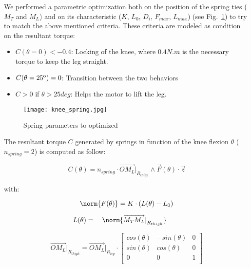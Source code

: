 We performed a parametric optimization both on the position of the spring ties ($M_T$ and $M_L$) and on its characteristic ($K$, $L_0$, $D_i$, $F_{max}$, $L_{max}$) (see Fig.~\ref{fig:knee_conception}) to try to match the above mentioned criteria. These criteria are modeled as condition on the resultant torque:

\begin{itemize}
    \item $C(\theta=0) < -0.4$: Locking of the knee, where $0.4 N.m$ is the necessary torque to keep the leg straight.
    \item $C(\theta=25 \textsuperscript{o} ) = 0$: Transition between the two behaviors
    \item $C > 0$ if $\theta > 25 deg$: Helps the motor to lift the leg.
\end{itemize}

\begin{figure}[thpb]
    \centering
    \texttt{[image: knee\_spring.jpg]}
    \caption{Spring parameters to optimized}
    \label{fig:knee_conception}
\end{figure}


The resultant torque $C$ generated by springs in function of the knee flexion $\theta$  ($n_{spring} = 2$) is computed as follow:

\begin{equation}
    C(\theta) = n_{spring} \cdot \overrightarrow{OM_L}{\rvert}_{R_{thigh}} \wedge \overrightarrow{F}(\theta) \cdot \overrightarrow{z}
\end{equation}

with:

\begin{equation}
    \norm{ F(\theta)} = K \cdot \left ( L(\theta) - L_0\right )
\end{equation}

\begin{equation}
    L(\theta) = \quad \norm{ \overrightarrow{M_T M_L}{\rvert}_{R_{thigh}}}\qquad
\end{equation}

\begin{equation}
    \overrightarrow{OM_L}{\rvert}_{R_{thigh}}  = \overrightarrow{OM_L}{\rvert}_{R_{leg}}  \cdot
    \begin{bmatrix}
        cos(\theta) & -sin(\theta) & 0 \\
        sin(\theta) & cos(\theta) & 0 \\
        0 & 0 & 1\\
    \end{bmatrix}
\end{equation}



